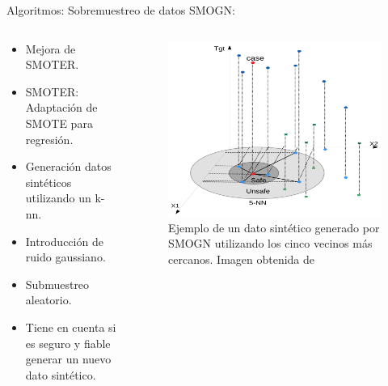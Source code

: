 \documentclass{beamer}
\begin{document}
\begin{frame}{Algoritmos: Sobremuestreo de datos}
	SMOGN:

	\begin{columns}[T]
		\begin{column}{.5\textwidth}
			\begin{itemize}
				\item Mejora de SMOTER.
				\item SMOTER: Adaptación de SMOTE para regresión.
				\item Generación datos sintéticos utilizando un k-nn.
				\item Introducción de ruido gaussiano.
				\item Submuestreo aleatorio.
				\item Tiene en cuenta si es seguro y fiable generar un nuevo dato sintético.
			\end{itemize}
		\end{column}

		\begin{column}{.5\textwidth}
			\begin{figure}[H]
			    \centering
				 \includegraphics[width=\textwidth]{SMOGN-5NN.png}
			    \caption{Ejemplo de un dato sintético generado por SMOGN utilizando los cinco vecinos más cercanos. Imagen obtenida de \cite{SMOGN}}
				 \label{fig:SMOGN-5NN}
			\end{figure}
		\end{column}

	\end{columns}

\end{frame}
\end{document}

